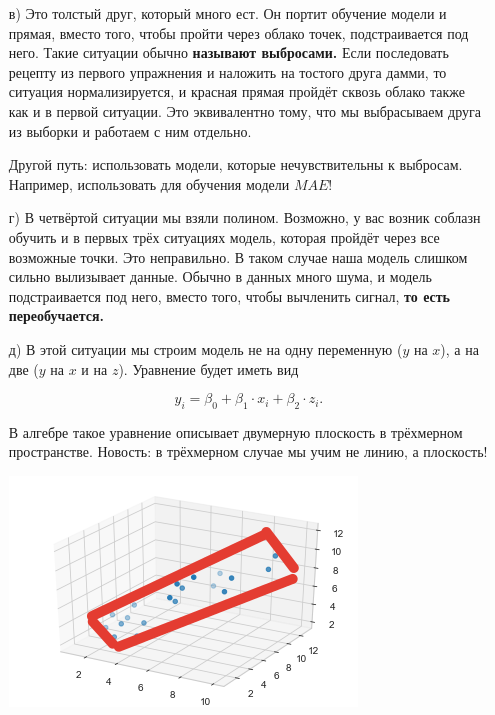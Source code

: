 \documentclass[12pt, a4paper, oneside]{article}
\theoremstyle{plain} %
\theoremstyle{definition}
\newcommand{\indef}[1]{\textbf{ \color{green} #1}}
\begin{document}
\begin{solution}
\begin{enumerate}
		\item[в)]  Это толстый друг, который много ест.  Он портит обучение модели и прямая, вместо того, чтобы пройти через облако точек, подстраивается под него. Такие ситуации обычно \indef{называют выбросами.} Если последовать рецепту из первого упражнения и наложить на тостого друга дамми, то ситуация нормализируется, и красная прямая пройдёт сквозь облако также как и в первой ситуации. Это эквивалентно тому, что мы выбрасываем друга из выборки и работаем с ним отдельно.
		
		Другой путь: использовать модели, которые нечувствительны к выбросам. Например,  использовать для обучения модели $MAE$!
		
		\item[г)]  В четвёртой ситуации мы взяли полином. Возможно, у вас возник соблазн обучить и в первых трёх ситуациях модель, которая пройдёт через все возможные точки. Это неправильно. В таком случае наша модель слишком сильно вылизывает данные. Обычно в данных много шума, и модель подстраивается под него, вместо того, чтобы вычленить сигнал, \indef{то есть переобучается.} 
		
		\item[д)]  В этой ситуации мы строим модель не на одну переменную ($y$ на $x$), а на две ($y$ на $x$ и на $z$). Уравнение будет иметь вид 
		
		$$
		y_i = \beta_0 + \beta_1 \cdot x_i + \beta_2 \cdot z_i.
		$$
		
		В алгебре такое уравнение описывает двумерную плоскость в трёхмерном пространстве. Новость: в трёхмерном случае мы учим не линию, а плоскость! 
		
		\begin{center}
			\includegraphics[scale=0.8]{regr_pic_5_ans.png}
		\end{center}
	\end{enumerate}
\end{solution}
\end{document}
